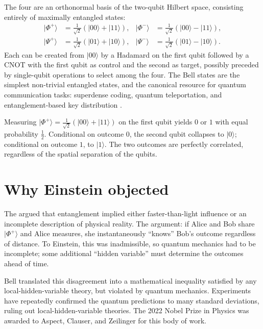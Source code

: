 The four  are an orthonormal basis of the two-qubit Hilbert space, consisting entirely of maximally entangled states:
\begin{align*}
  |\Phi^+\rangle &= \tfrac{1}{\sqrt 2}(|00\rangle + |11\rangle), &
  |\Phi^-\rangle &= \tfrac{1}{\sqrt 2}(|00\rangle - |11\rangle), \\
  |\Psi^+\rangle &= \tfrac{1}{\sqrt 2}(|01\rangle + |10\rangle), &
  |\Psi^-\rangle &= \tfrac{1}{\sqrt 2}(|01\rangle - |10\rangle).
\end{align*}
Each can be created from $|00\rangle$ by a Hadamard on the first qubit followed by a CNOT with the first qubit as control and the second as target, possibly preceded by single-qubit operations to select among the four. The Bell states are the simplest non-trivial entangled states, and the canonical resource for quantum communication tasks: superdense coding, quantum teleportation, and entanglement-based key distribution \citep{nielsen_quantum_2010,bennett_quantum_2014}.

\begin{example}
Measuring $|\Phi^+\rangle = \tfrac{1}{\sqrt 2}(|00\rangle + |11\rangle)$ on the first qubit yields $0$ or $1$ with equal probability $\tfrac12$. Conditional on outcome $0$, the second qubit collapses to $|0\rangle$; conditional on outcome $1$, to $|1\rangle$. The two outcomes are perfectly correlated, regardless of the spatial separation of the qubits.
\end{example}

\section{Why Einstein objected}

The  \citep{einstein_can_1935} argued that entanglement implied either faster-than-light influence or an incomplete description of physical reality. The argument: if Alice and Bob share $|\Phi^+\rangle$ and Alice measures, she instantaneously ``knows'' Bob's outcome regardless of distance. To Einstein, this was inadmissible, so quantum mechanics had to be incomplete; some additional ``hidden variable'' must determine the outcomes ahead of time.

Bell \citep{bell_einstein_1964} translated this disagreement into a mathematical inequality satisfied by any local-hidden-variable theory, but violated by quantum mechanics. Experiments \citep{aspect_experimental_1982} have repeatedly confirmed the quantum predictions to many standard deviations, ruling out local-hidden-variable theories. The 2022 Nobel Prize in Physics was awarded to Aspect, Clauser, and Zeilinger for this body of work.


